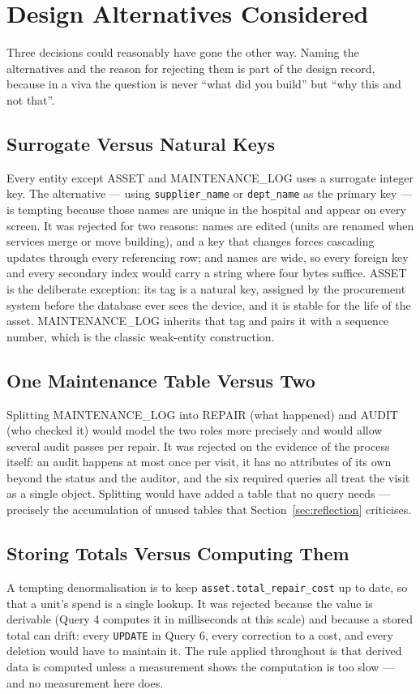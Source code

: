\documentclass[conference]{IEEEtran}
\begin{document}
\section{Design Alternatives Considered}
Three decisions could reasonably have gone the other way. Naming the
alternatives and the reason for rejecting them is part of the design record,
because in a viva the question is never ``what did you build'' but ``why
this and not that''.

\subsection{Surrogate Versus Natural Keys}
Every entity except ASSET and MAINTENANCE\_LOG uses a surrogate integer key.
The alternative --- using \texttt{supplier\_name} or \texttt{dept\_name} as the
primary key --- is tempting because those names are unique in the hospital and
appear on every screen. It was rejected for two reasons: names are edited
(units are renamed when services merge or move building), and a key that
changes forces cascading updates through every referencing row; and names are
wide, so every foreign key and every secondary index would carry a string
where four bytes suffice. ASSET is the deliberate exception: its tag is a
natural key, assigned by the procurement system before the database ever sees
the device, and it is stable for the life of the asset. MAINTENANCE\_LOG
inherits that tag and pairs it with a sequence number, which is the classic
weak-entity construction.

\subsection{One Maintenance Table Versus Two}
Splitting MAINTENANCE\_LOG into REPAIR (what happened) and AUDIT (who checked
it) would model the two roles more precisely and would allow several audit
passes per repair. It was rejected on the evidence of the process itself: an
audit happens at most once per visit, it has no attributes of its own beyond
the status and the auditor, and the six required queries all treat the visit
as a single object. Splitting would have added a table that no query needs ---
precisely the accumulation of unused tables that Section~\ref{sec:reflection}
criticises.

\subsection{Storing Totals Versus Computing Them}
A tempting denormalisation is to keep \texttt{asset.total\_repair\_cost} up to
date, so that a unit's spend is a single lookup. It was rejected because the
value is derivable (Query 4 computes it in milliseconds at this scale) and
because a stored total can drift: every \texttt{UPDATE} in Query 6, every
correction to a cost, and every deletion would have to maintain it. The rule
applied throughout is that derived data is computed unless a measurement shows
the computation is too slow --- and no measurement here does.
\end{document}
